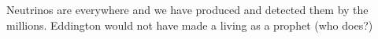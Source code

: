 \begin{frame}
\begin{columns}
Neutrinos are everywhere and we have produced and detected them by the millions. Eddington would not have made a living as a prophet (who does?)


\end{columns}




\end{frame}

